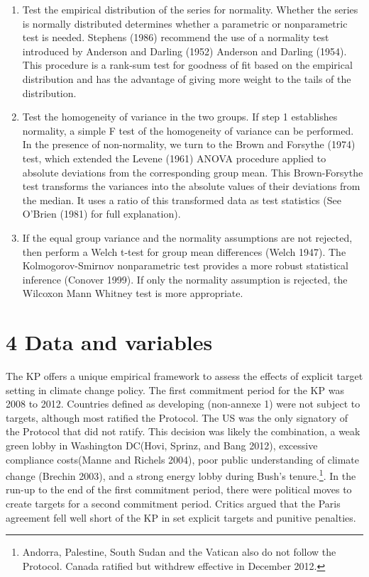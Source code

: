 \documentclass[
  10pt,
]{article}
\begin{document}
\begin{enumerate}
\def\labelenumi{\arabic{enumi}.}
\item
  Test the empirical distribution of the series for normality. Whether
  the series is normally distributed determines whether a parametric or
  nonparametric test is needed. Stephens (1986) recommend the use of a
  normality test introduced by Anderson and Darling (1952) Anderson and
  Darling (1954). This procedure is a rank-sum test for goodness of fit
  based on the empirical distribution and has the advantage of giving
  more weight to the tails of the distribution.
\item
  Test the homogeneity of variance in the two groups. If step 1
  establishes normality, a simple F test of the homogeneity of variance
  can be performed. In the presence of non-normality, we turn to the
  Brown and Forsythe (1974) test, which extended the Levene (1961) ANOVA
  procedure applied to absolute deviations from the corresponding group
  mean. This Brown-Forsythe test transforms the variances into the
  absolute values of their deviations from the median. It uses a ratio
  of this transformed data as test statistics (See O'Brien (1981) for
  full explanation).
\item
  If the equal group variance and the normality assumptions are not
  rejected, then perform a Welch t-test for group mean differences
  (Welch 1947). The Kolmogorov-Smirnov nonparametric test provides a
  more robust statistical inference (Conover 1999). If only the
  normality assumption is rejected, the Wilcoxon Mann Whitney test is
  more appropriate.
\end{enumerate}

\hypertarget{data-and-variables}{%
\section{4 Data and variables}\label{data-and-variables}}

The KP offers a unique empirical framework to assess the effects of
explicit target setting in climate change policy. The first commitment
period for the KP was 2008 to 2012. Countries defined as developing
(non-annexe 1) were not subject to targets, although most ratified the
Protocol. The US was the only signatory of the Protocol that did not
ratify. This decision was likely the combination, a weak green lobby in
Washington DC(Hovi, Sprinz, and Bang 2012), excessive compliance
costs(Manne and Richels 2004), poor public understanding of climate
change (Brechin 2003), and a strong energy lobby during Bush's
tenure.\footnote{Andorra, Palestine, South Sudan and the Vatican also do
  not follow the Protocol. Canada ratified but withdrew effective in
  December 2012.}. In the run-up to the end of the first commitment
period, there were political moves to create targets for a second
commitment period. Critics argued that the Paris agreement fell well
short of the KP in set explicit targets and punitive penalties.
\end{document}
